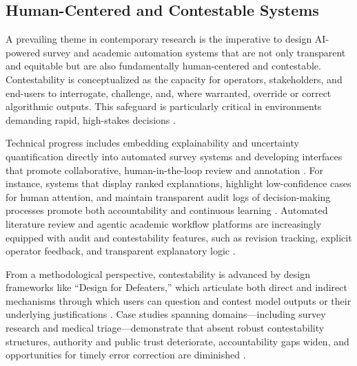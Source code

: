 \subsection{Human-Centered and Contestable Systems}

A prevailing theme in contemporary research is the imperative to design AI-powered survey and academic automation systems that are not only transparent and equitable but are also fundamentally human-centered and contestable. Contestability is conceptualized as the capacity for operators, stakeholders, and end-users to interrogate, challenge, and, where warranted, override or correct algorithmic outputs. This safeguard is particularly critical in environments demanding rapid, high-stakes decisions \cite{ref39}\cite{ref76}\cite{ref80}\cite{ref83}\cite{ref85}\cite{ref92}\cite{ref94}\cite{ref96}\cite{ref100}\cite{ref105}\cite{ref106}.

Technical progress includes embedding explainability and uncertainty quantification directly into automated survey systems and developing interfaces that promote collaborative, human-in-the-loop review and annotation \cite{ref39}\cite{ref80}\cite{ref83}\cite{ref85}\cite{ref100}\cite{ref105}\cite{ref106}. For instance, systems that display ranked explanations, highlight low-confidence cases for human attention, and maintain transparent audit logs of decision-making processes promote both accountability and continuous learning \cite{ref76}\cite{ref80}\cite{ref85}\cite{ref100}\cite{ref105}. Automated literature review and agentic academic workflow platforms are increasingly equipped with audit and contestability features, such as revision tracking, explicit operator feedback, and transparent explanatory logic \cite{ref76}\cite{ref80}\cite{ref102}\cite{ref103}\cite{ref105}.

From a methodological perspective, contestability is advanced by design frameworks like ``Design for Defeaters,'' which articulate both direct and indirect mechanisms through which users can question and contest model outputs or their underlying justifications \cite{ref85}\cite{ref92}\cite{ref94}. Case studies spanning domains—including survey research and medical triage—demonstrate that absent robust contestability structures, authority and public trust deteriorate, accountability gaps widen, and opportunities for timely error correction are diminished \cite{ref39}\cite{ref80}\cite{ref85}\cite{ref92}\cite{ref94}.

